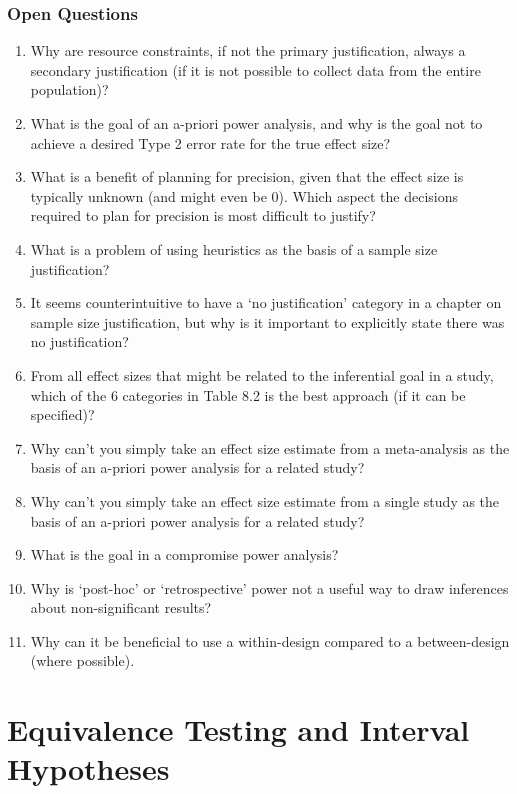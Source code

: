 \documentclass[
  oneside]{book}
\begin{document}
\hypertarget{open-questions-6}{%
\subsection{Open Questions}\label{open-questions-6}}

\begin{enumerate}
\def\labelenumi{\arabic{enumi}.}
\item
  Why are resource constraints, if not the primary justification, always a secondary justification (if it is not possible to collect data from the entire population)?
\item
  What is the goal of an a-priori power analysis, and why is the goal not to achieve a desired Type 2 error rate for the true effect size?
\item
  What is a benefit of planning for precision, given that the effect size is typically unknown (and might even be 0). Which aspect the decisions required to plan for precision is most difficult to justify?
\item
  What is a problem of using heuristics as the basis of a sample size justification?
\item
  It seems counterintuitive to have a `no justification' category in a chapter on sample size justification, but why is it important to explicitly state there was no justification?
\item
  From all effect sizes that might be related to the inferential goal in a study, which of the 6 categories in Table 8.2 is the best approach (if it can be specified)?
\item
  Why can't you simply take an effect size estimate from a meta-analysis as the basis of an a-priori power analysis for a related study?
\item
  Why can't you simply take an effect size estimate from a single study as the basis of an a-priori power analysis for a related study?
\item
  What is the goal in a compromise power analysis?
\item
  Why is `post-hoc' or `retrospective' power not a useful way to draw inferences about non-significant results?
\item
  Why can it be beneficial to use a within-design compared to a between-design (where possible).
\end{enumerate}

\hypertarget{equivalencetest}{%
\chapter{Equivalence Testing and Interval Hypotheses}\label{equivalencetest}}
\end{document}
